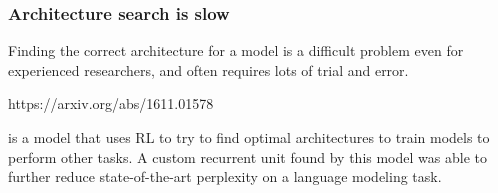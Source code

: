 \subsubsection{Architecture search is slow}
Finding the correct architecture for a model is a difficult problem even for experienced researchers, and often requires lots of trial and error. \begin{tt}https://arxiv.org/abs/1611.01578\end{tt} is a model that uses RL to try to find optimal architectures to train models to perform other tasks. A custom recurrent unit found by this model was able to further reduce state-of-the-art perplexity on a language modeling task.
